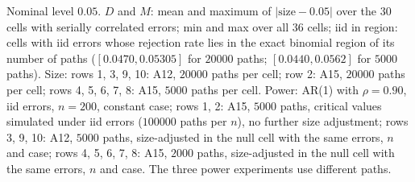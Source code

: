Nominal level $0.05$. $D$ and $M$: mean and maximum of $|\text{size} - 0.05|$ over the 30 cells with serially correlated errors; min and max over all 36 cells; iid in region: cells with iid errors whose rejection rate lies in the exact binomial region of its number of paths ($[0.0470, 0.05305]$ for $20000$ paths; $[0.0440, 0.0562]$ for $5000$ paths). Size: rows 1, 3, 9, 10: A12, $20000$ paths per cell; row 2: A15, $20000$ paths per cell; rows 4, 5, 6, 7, 8: A15, $5000$ paths per cell. Power: AR(1) with $\rho = 0.90$, iid errors, $n = 200$, constant case; rows 1, 2: A15, $5000$ paths, critical values simulated under iid errors ($100000$ paths per $n$), no further size adjustment; rows 3, 9, 10: A12, $5000$ paths, size-adjusted in the null cell with the same errors, $n$ and case; rows 4, 5, 6, 7, 8: A15, $2000$ paths, size-adjusted in the null cell with the same errors, $n$ and case. The three power experiments use different paths.

